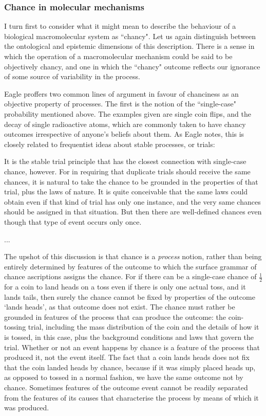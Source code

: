\subsubsection{Chance in molecular mechanisms}
I turn first to consider what it might mean to describe the behaviour of a biological macromolecular system as ``chancy". Let us again distinguish between the ontological and epistemic dimensions of this description. There is a sense in which the operation of a macromolecular mechanism could be said to be objectively chancy, and one in which the ``chancy" outcome reflects our ignorance of some source of variability in the process.

Eagle proffers two common lines of argument in favour of chanciness as an objective property of processes. The first is the notion of the ``single-case" probability mentioned above. The examples given are single coin flips, and the decay of single radioactive atoms, which are commonly taken to have chancy outcomes irrespective of anyone's beliefs about them. As Eagle notes, this is closely related to frequentist ideas about stable processes, or trials:

\begin{longquote}
It is the stable trial principle that has the closest connection with single-case chance, however. For in requiring that duplicate trials should receive the same chances, it is natural to take the chance to be grounded in the properties of that trial, plus the laws of nature. It is quite conceivable that the same laws could obtain even if that kind of trial has only one instance, and the very same chances should be assigned in that situation. But then there are well-defined chances even though that type of event occurs only once.

...

The upshot of this discussion is that chance is a \textit{process} notion, rather than being entirely determined by features of the outcome to which the surface grammar of chance ascriptions assigns the chance. For if there can be a single-case chance of $\frac{1}{2}$
for a coin to land heads on a toss even if there is only one actual toss, and it lands tails, then surely the chance cannot be fixed by properties of the outcome ‘lands heads’, as that outcome does not exist. The chance must rather be grounded in features of the process that can produce the outcome: the coin-tossing trial, including the mass distribution of the coin and the details of how it is tossed, in this case, plus the background conditions and laws that govern the trial. Whether or not an event happens by chance is a feature of the process that produced it, not the event itself. The fact that a coin lands heads does not fix that the coin landed heads by chance, because if it was simply placed heads up, as opposed to tossed in a normal fashion, we have the same outcome not by chance. Sometimes features of the outcome event cannot be readily separated from the features of its causes that characterise the process by means of which it was produced. 

\cite{Eagle2018}
\end{longquote}

